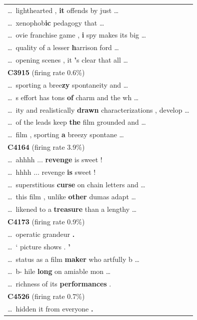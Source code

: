 \begin{longtable}{@{}>{\ttfamily}p{\linewidth}@{}}
    \cmidrule(){1-1}
    \dots\ lighthearted ,\textbf{ it} offends by just \dots\\
    \dots\ xenophob\textbf{ic} pedagogy that \dots\\
    \dots\ ovie franchise game ,\textbf{ i} spy makes its big \dots\\
    \dots\ quality of a lesser\textbf{ h}arrison ford \dots\\
    \dots\ opening scenes , it\textbf{ '}s clear that all \dots\\
    \addlinespace
    {\normalfont\textbf{C3915} \hfill (firing rate 0.6\%)}\\
    \cmidrule(){1-1}
    \dots\ sporting a bree\textbf{zy} spontaneity and \dots\\
    \dots\ s effort has tons\textbf{ of} charm and the wh \dots\\
    \dots\ ity and realistically\textbf{ drawn} characterizations , develop \dots\\
    \dots\ of the leads keep\textbf{ the} film grounded and \dots\\
    \dots\ film , sporting\textbf{ a} breezy spontane \dots\\
    \addlinespace
    {\normalfont\textbf{C4164} \hfill (firing rate 3.9\%)}\\
    \cmidrule(){1-1}
    \dots\ ahhhh ...\textbf{ revenge} is sweet !\\
    \dots\ hhhh ... revenge\textbf{ is} sweet !\\
    \dots\ superstitious\textbf{ curse} on chain letters and \dots\\
    \dots\ this film , unlike\textbf{ other} dumas adapt \dots\\
    \dots\ likened to a\textbf{ treasure} than a lengthy \dots\\
    \addlinespace
    {\normalfont\textbf{C4173} \hfill (firing rate 0.9\%)}\\
    \cmidrule(){1-1}
    \dots\ operatic grandeur\textbf{ .} \\
    \dots\ ` picture shows .\textbf{ '} \\
    \dots\ status as a film\textbf{ maker} who artfully b \dots\\
    \dots\ b- hile\textbf{ long} on amiable mon \dots\\
    \dots\ richness of its\textbf{ performances} .\\
    \addlinespace
    {\normalfont\textbf{C4526} \hfill (firing rate 0.7\%)}\\
    \cmidrule(){1-1}
    \dots\ hidden it from everyone\textbf{ .} \\

\end{longtable}
